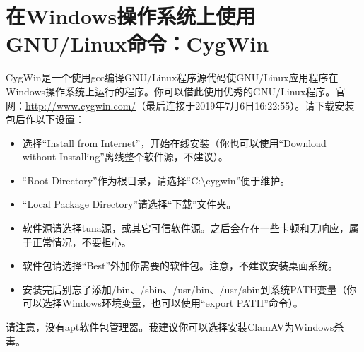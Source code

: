 \documentclass{book}
\begin{document}
\section{在Windows操作系统上使用GNU/Linux命令：CygWin}
CygWin是一个使用gcc编译GNU/Linux程序源代码使GNU/Linux应用程序在Windows操作系统上运行的程序。你可以借此使用优秀的GNU/Linux程序。官网：\url{http://www.cygwin.com/}（最后连接于2019年7月6日16:22:55）。请下载安装包后作以下设置：
\begin{itemize}
\item 选择“Install from Internet”，开始在线安装（你也可以使用“Download without Installing”离线整个软件源，不建议）。
\item “Root Directory”作为根目录，请选择“C:\textbackslash cygwin”便于维护。
\item “Local Package Directory”请选择“下载”文件夹。
\item 软件源请选择tuna源，或其它可信软件源。之后会存在一些卡顿和无响应，属于正常情况，不要担心。
\item 软件包请选择“Best”外加你需要的软件包。注意，不建议安装桌面系统。
\item 安装完后别忘了添加/bin、/sbin、/usr/bin、/usr/sbin到系统PATH变量（你可以选择Windows环境变量，也可以使用“export PATH”命令）。 
\end{itemize}
请注意，没有apt软件包管理器。我建议你可以选择安装ClamAV为Windows杀毒。
\end{document}
